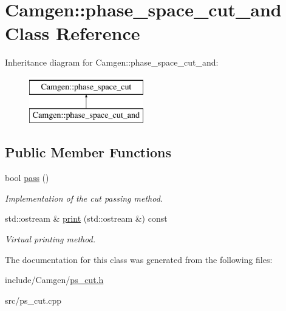 \hypertarget{a00414}{\section{Camgen\-:\-:phase\-\_\-space\-\_\-cut\-\_\-and Class Reference}
\label{a00414}
}
Inheritance diagram for Camgen\-:\-:phase\-\_\-space\-\_\-cut\-\_\-and\-:\begin{figure}[H]
\begin{center}
\leavevmode
\includegraphics[height=2.000000cm]{a00414}
\end{center}
\end{figure}
\subsection*{Public Member Functions}
\begin{DoxyCompactItemize}
\item 
\hypertarget{a00414_aeed92e4545305d02832225caf1063548}{bool \hyperlink{a00414_aeed92e4545305d02832225caf1063548}{pass} ()}\label{a00414_aeed92e4545305d02832225caf1063548}

\begin{DoxyCompactList}\small\item\em Implementation of the cut passing method. \end{DoxyCompactList}\item 
\hypertarget{a00414_ac421003078cd2480bfc6dabc719235b4}{std\-::ostream \& \hyperlink{a00414_ac421003078cd2480bfc6dabc719235b4}{print} (std\-::ostream \&) const }\label{a00414_ac421003078cd2480bfc6dabc719235b4}

\begin{DoxyCompactList}\small\item\em Virtual printing method. \end{DoxyCompactList}\end{DoxyCompactItemize}


The documentation for this class was generated from the following files\-:\begin{DoxyCompactItemize}
\item 
include/\-Camgen/\hyperlink{a00713}{ps\-\_\-cut.\-h}\item 
src/ps\-\_\-cut.\-cpp\end{DoxyCompactItemize}
